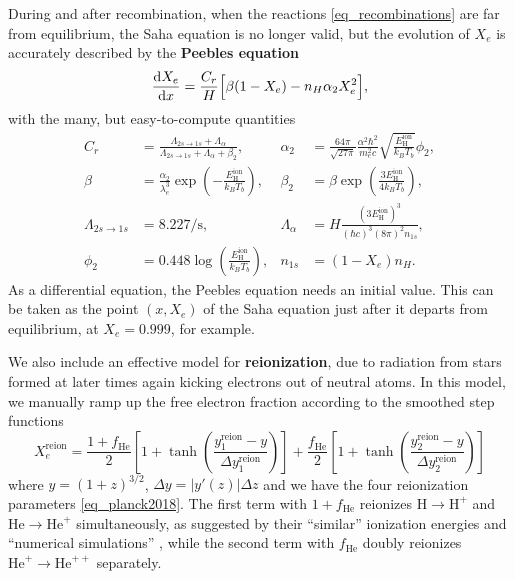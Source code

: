 \documentclass[10pt,a4paper]{article}
\begin{document}
During and after recombination, when the reactions \eqref{eq_recombinations} are far from equilibrium,
the Saha equation is no longer valid,
but the evolution of $X_e$ is accurately described by the \textbf{Peebles equation}
\begin{equation}
	\odv{X_e}{x} = \frac{C_r}{H} \Big[ \beta (1-X_e) - n_H \alpha_2 X_e^2 \Big],
\label{eq_Peebles}
\end{equation}
with the many, but easy-to-compute quantities
\begin{align*}
	C_r &= \frac{\Lambda_{2s \rightarrow 1s} + \Lambda_\alpha}{\Lambda_{2s \rightarrow 1s} + \Lambda_\alpha + \beta_2}, &
	\alpha_2 &= \frac{64 \pi}{\sqrt{27 \pi}} \frac{\alpha^2 \hbar^2}{m_e^2 c} \sqrt{\frac{E^\text{ion}_\text{H}}{k_B T_b}} \phi_2, \\
	\beta &= \frac{\alpha_2}{\lambda_e^3} \exp \left(-\frac{E^\text{ion}_\text{H}}{k_B T_b}\right), &
	\beta_2 &= \beta \exp \left(\frac{3 E^\text{ion}_\text{H}}{4 k_B T_b}\right), \\
	\Lambda_{2s \rightarrow 1s} &= 8.227 / \mathrm{s}, &
	\Lambda_\alpha &= H \frac{(3 E^\text{ion}_{\text{H}})^3}{(\hbar c)^3 (8 \pi)^2 n_{1s}}, \\
	\phi_2 &= 0.448 \log \left( \frac{E^\text{ion}_\text{H}}{k_B T_b} \right), &
	n_{1s} &= (1-X_e) n_H.
\end{align*}
As a differential equation, the Peebles equation needs an initial value.
This can be taken as the point $(x, X_e)$ of the Saha equation just after it departs from equilibrium, at $X_e = 0.999$, for example.

We also include an effective model for \textbf{reionization}, due to radiation from stars formed at later times again kicking electrons out of neutral atoms.
In this model, we manually ramp up the free electron fraction according to the smoothed step functions
\begin{equation}
	X_e^\text{reion} = \frac{1+f_\text{He}}{2} \left[ 1 + \tanh \left( \frac{y^\text{reion}_1-y}{\Delta y^\text{reion}_1} \right) \right]
                     + \frac{f_\text{He}}{2} \left[ 1 + \tanh \left( \frac{y^\text{reion}_2-y}{\Delta y^\text{reion}_2} \right) \right]
\label{eq_reionization}
\end{equation}
where $y = (1+z)^{3/2}$, $\Delta y = |y'(z)| \Delta z$ and we have the four reionization parameters \eqref{eq_planck2018}.
The first term with $1+f_\text{He}$ reionizes $\text{H} \rightarrow \text{H}^+$ and $\text{He} \rightarrow \text{He}^+$ simultaneously,
as suggested by their ``similar'' ionization energies and ``numerical simulations'' \cite[appendix B]{lewisCosmologicalParametersWMAP2008},
while the second term with $f_\text{He}$ doubly reionizes $\text{He}^{+} \rightarrow \text{He}^{++}$ separately.
\end{document}
